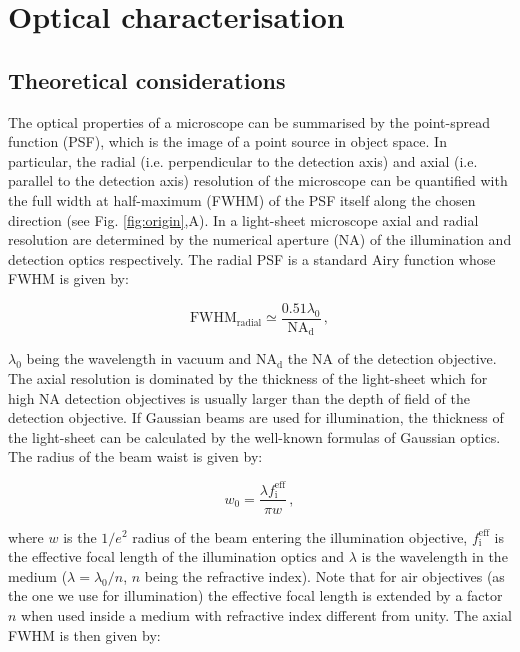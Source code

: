 \documentclass[12pt]{spieman}  %
\begin{document}
\section{Optical characterisation}

\subsection{Theoretical considerations}

The optical properties of a microscope can be summarised by the point-spread function (PSF), which is the image of a point source in object space. In particular, the radial (i.e. perpendicular to the detection axis) and axial (i.e. parallel to the detection axis) resolution of the microscope can be quantified with the full width at half-maximum (FWHM) of the PSF itself along the chosen direction (see Fig. \ref{fig:origin},A). In a light-sheet microscope axial and radial resolution are determined by the numerical aperture (NA) of the illumination and detection optics respectively. The radial PSF is a standard Airy function whose FWHM is given by:

\begin{equation}
\text{FWHM}_{\text{radial}} \simeq \frac{0.51 \lambda_0}{\text{NA}_{\text{d}}} \, ,
\end{equation}

$\lambda_0$ being the wavelength in vacuum and $\text{NA}_{\text{d}}$ the NA of the detection objective. The axial resolution is dominated by the thickness of the light-sheet which for high NA detection objectives is usually larger than the depth of field of the detection objective. If Gaussian beams are used for illumination, the thickness of the light-sheet can be calculated by the well-known formulas of Gaussian optics\cite{Teich}. The radius of the beam waist is given by:

\begin{equation}
w_0 = \frac{\lambda f_{\text{i}}^{\text{eff}}}{\pi w} \, ,
\end{equation}

where $w$ is the $1/e^2$ radius of the beam entering the illumination objective, $ f_{\text{i}}^{\text{eff}}$ is the effective focal length of the illumination optics and $\lambda$ is the wavelength in the medium ($\lambda = \lambda_0 / n$, $n$ being the refractive index). Note that for air objectives (as the one we use for illumination) the effective focal length is extended by a factor $n$ when used inside a medium with refractive index different from unity\cite{Silvestri2012}.
The axial FWHM is then given by:
\end{document}
